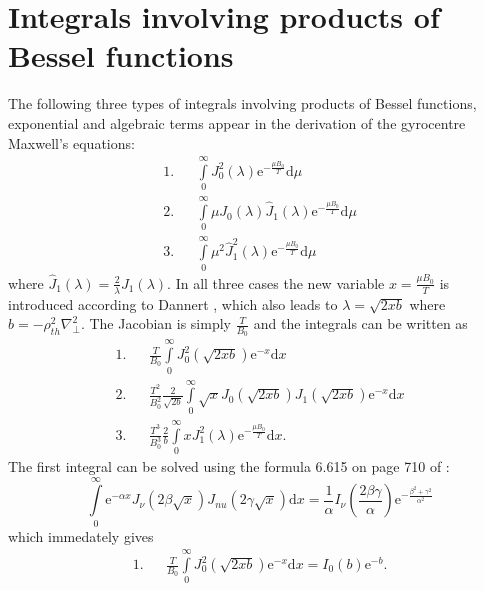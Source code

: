 \documentclass[a4paper,10pt]{article}
\begin{document}
\newpage

\appendix

\section{Integrals involving products of Bessel functions} \label{app:bessel_integral}
The following three types of integrals involving products of Bessel functions, exponential and algebraic terms appear in the derivation of the gyrocentre Maxwell's equations:
\begin{eqnarray}
	1. && \int \limits_{0}^{\infty} J_0^2(\lambda) \mathrm{e}^{-\frac{\mu B_0}{T}} \mathrm{d} \mu \\
	2. && \int \limits_{0}^{\infty} \mu J_0(\lambda) \hat{J}_1(\lambda) \mathrm{e}^{-\frac{\mu B_0}{T}} \mathrm{d} \mu \\
	3. && \int \limits_{0}^{\infty} \mu^2 \hat{J}_1^2(\lambda) \mathrm{e}^{-\frac{\mu B_0}{T}} \mathrm{d} \mu
\end{eqnarray}
where $\hat{J}_1(\lambda) = \frac{2}{\lambda} J_1(\lambda)$. In all three cases the new variable $x = \frac{\mu B_0}{T}$ is introduced according to Dannert \cite{dannert}, which also leads to $\lambda = \sqrt{2 x b}$ where $b = - \rho_{th}^2 \nabla_{\perp}^2$. The Jacobian is simply $\frac{T}{B_0}$ and the integrals can be written as
\begin{eqnarray*}
	1. && \frac{T}{B_0} \int \limits_{0}^{\infty} J_0^2(\sqrt{2 x b}) \mathrm{e}^{-x} \mathrm{d} x \\
	2. && \frac{T^2}{B_0^2} \frac{2}{\sqrt{2b}} \int \limits_{0}^{\infty} \sqrt{x} J_0(\sqrt{2 x b}) J_1(\sqrt{2 x b}) \mathrm{e}^{-x} \mathrm{d} x \\
	3. && \frac{T^3}{B_0^3} \frac{2}{b} \int \limits_{0}^{\infty} x J_1^2(\lambda) \mathrm{e}^{-\frac{\mu B_0}{T}} \mathrm{d} x.
\end{eqnarray*}
The first integral can be solved using the formula 6.615 on page 710 of \cite{g_and_r}:
\[\int \limits_0^{\infty} \mathrm{e}^{- \alpha x} J_{\nu}(2 \beta \sqrt{x}) J_{nu}(2 \gamma \sqrt{x}) \mathrm{d} x = \frac{1}{\alpha} I_{\nu}\left( \frac{2 \beta \gamma}{\alpha} \right) \mathrm{e}^{-\frac{\beta^2 + \gamma^2}{\alpha^2}}\]
which immedately gives
\begin{eqnarray*}
	1. && \frac{T}{B_0} \int \limits_{0}^{\infty} J_0^2(\sqrt{2 x b}) \mathrm{e}^{-x} \mathrm{d} x = I_0(b) \mathrm{e}^{-b}.
\end{eqnarray*}
\end{document}
